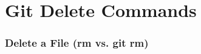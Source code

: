 
\section[Delete]{Git Delete Commands}

\begin{frame}
\frametitle{\large Delete a File (rm vs. git rm)}
\end{frame}